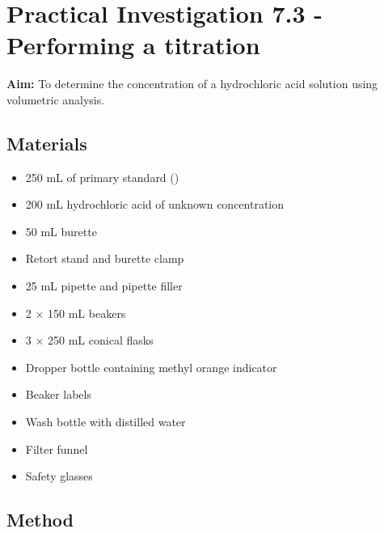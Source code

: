 \section{Practical Investigation 7.3 - Performing a titration}

	\textbf{Aim:} To determine the concentration of a hydrochloric acid solution using volumetric analysis.

	\subsection{Materials}
	
		\begin{itemize}
			\item 250 mL of primary standard ()
			\item 200 mL hydrochloric acid of unknown concentration
			\item 50 mL burette
			\item Retort stand and burette clamp
			\item 25 mL pipette and pipette filler
			\item 2 $\times$ 150 mL beakers
			\item 3 $\times$ 250 mL conical flasks
			\item Dropper bottle containing methyl orange indicator
			\item Beaker labels
			\item Wash bottle with distilled water
			\item Filter funnel
			\item Safety glasses
		\end{itemize}

	\subsection{Method}
	
